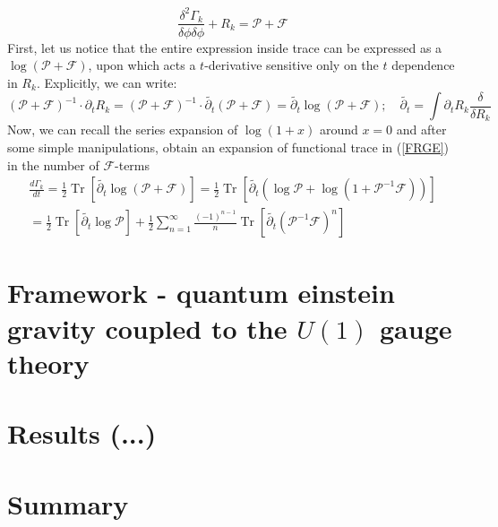 \documentclass[11pt, a4paper]{article}
\begin{document}
\begin{equation}
    \frac{\delta^2 \Gamma_k}{\delta \phi \delta \phi} + R_k = \mathcal{P} + \mathcal{F}
\end{equation}
First, let us notice that the entire expression inside trace can be expressed as a $\log{(\mathcal{P}+\mathcal{F})}$, upon which acts
a $t$-derivative sensitive only on the $t$ dependence in $R_k$. Explicitly, we can write:
\begin{equation}
    \left(\mathcal{P} + \mathcal{F}\right)^{-1} \cdot \partial_t R_k = \left(\mathcal{P} + \mathcal{F}\right)^{-1} \cdot \widetilde{\partial_t} \left(\mathcal{P}+\mathcal{F}\right) = \widetilde{\partial_t} \log{\left(\mathcal{P}+\mathcal{F}\right)}; \quad \widetilde{\partial_t} = \int \partial_t R_k \frac{\delta}{\delta R_k}
\end{equation}
Now, we can recall the series expansion of $\log{(1+x)}$ around $x=0$ and after some simple manipulations, obtain an expansion of functional trace in (\ref{FRGE}) in
the number of $\mathcal{F}$-terms
\begin{gather}
    \frac{d \Gamma_k}{dt} = \frac{1}{2} \operatorname{Tr} \left[ \widetilde{\partial_t} \log{\left(\mathcal{P}+\mathcal{F}\right)} \right] = \frac{1}{2} \operatorname{Tr} \left[ \widetilde{\partial_t} \left(\log{\mathcal{P}} + \log{(1+\mathcal{P}^{-1}\mathcal{F})}\right) \right] \\ =  \frac{1}{2} \operatorname{Tr} \left[ \widetilde{\partial_t} \log{\mathcal{P}} \right] + \frac{1}{2} \sum_{n=1}^{\infty} \frac{(-1)^{n-1}}{n} \operatorname{Tr}\left[\widetilde{\partial_t}\left(\mathcal{P}^{-1}\mathcal{F}\right)^n\right]
\end{gather}


\section{Framework - quantum einstein gravity coupled to the $U(1)$ gauge theory}

\section{Results (...)}

\section*{Summary}
\end{document}
